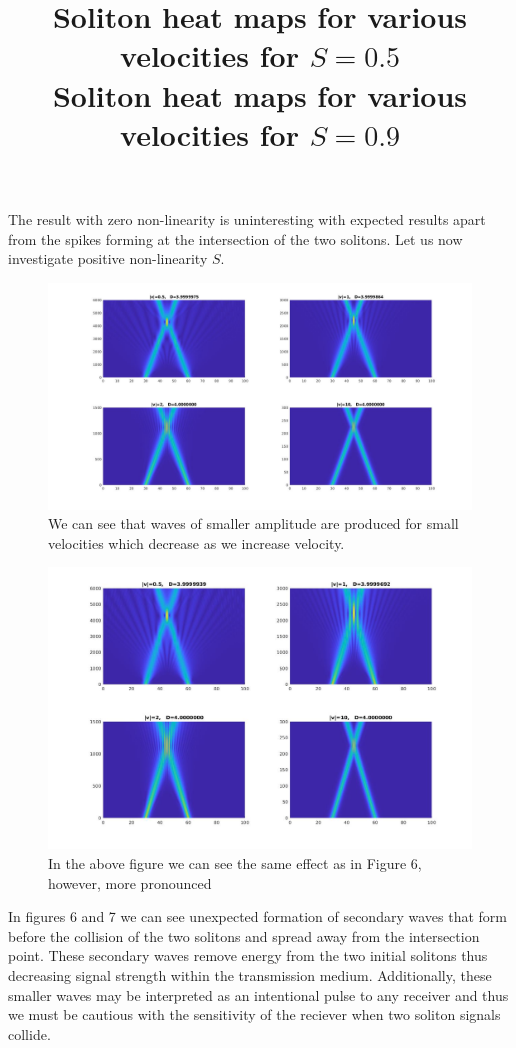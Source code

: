 \documentclass{article}
\begin{document}
\begin{enumerate}
The result with zero non-linearity is uninteresting with expected results apart from the spikes forming at the intersection of the two solitons. Let us now investigate positive non-linearity $S$. \pagebreak
\pagebreak
\begin{figure}[h!]
\title{Soliton heat maps for various velocities for $S=0.5$\\}
\includegraphics[scale=0.32,center]{3D_V_S05.jpg}
\caption{We can see that waves of smaller amplitude are produced for small velocities which decrease as we increase velocity.}
\end{figure}
\begin{figure}[h!]
\title{Soliton heat maps for various velocities for $S=0.9$\\}
\includegraphics[scale=0.35,center]{3D_V_S09.jpg}
\caption{In the above figure we can see the same effect as in Figure 6, however, more pronounced}
\end{figure}
\begin{flushleft}
In figures 6 and 7 we can see unexpected formation of secondary waves that form before the collision of the two solitons and spread away from the intersection point. These secondary waves remove energy from the two initial solitons thus decreasing signal strength within the transmission medium. Additionally, these smaller waves may be interpreted as an intentional pulse to any receiver and thus we must be cautious with the sensitivity of the reciever when two soliton signals collide. \\

\end{flushleft}
\end{enumerate}
\end{document}
